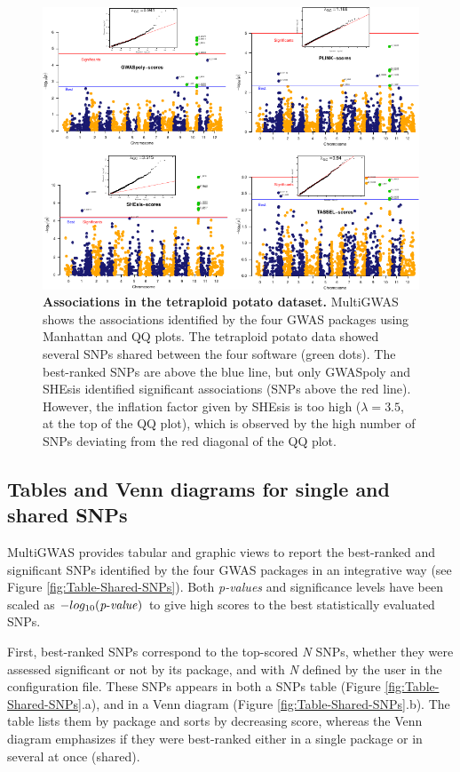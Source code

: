 \documentclass{article}
\begin{document}
\begin{figure}[H]
\begin{centering}
\includegraphics{images/paper-manhattan-QQ-plots}
\par\end{centering}
\caption{\textbf{{Associations in the tetraploid potato dataset.}} MultiGWAS shows the associations identified by the four GWAS packages using Manhattan and QQ plots. The tetraploid potato data showed several SNPs shared between the four software (green dots). The best-ranked SNPs are above the blue line, but only GWASpoly and SHEsis identified significant associations (SNPs above the red line). However, the inflation factor given by SHEsis is too high ($\lambda=3.5$, at the top of the QQ plot), which is observed by the high number of SNPs deviating from the red diagonal of the QQ plot. \label{fig:view-qqmanhattan}}
\end{figure}

\subsection{Tables and Venn diagrams for single and shared SNPs}

MultiGWAS provides tabular and graphic views to report the best-ranked and significant SNPs identified by the four GWAS packages in an integrative way (see Figure \ref{fig:Table-Shared-SNPs}). Both \emph{p-values} and significance levels have been scaled as $-log_{10}({\operatorname{\mathit{p-value}}})$ to give high scores to the best statistically evaluated SNPs.

First, best-ranked SNPs correspond to the top-scored \emph{N} SNPs, whether they were assessed significant or not by its package, and with\emph{
N} defined by the user in the configuration file. These SNPs appears in both a SNPs table (Figure \ref{fig:Table-Shared-SNPs}.a), and in
a Venn diagram (Figure \ref{fig:Table-Shared-SNPs}.b). The table lists them by package and sorts by decreasing score, whereas the Venn diagram emphasizes if they were best-ranked either in a single package or in several at once (shared). 
\end{document}
